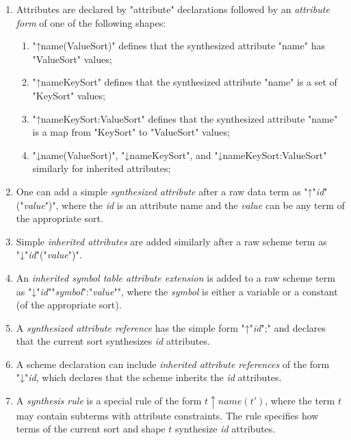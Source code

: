 \documentclass[11pt]{article} %
\begin{document}
\begin{manual}\label{man:attributes}\leavevmode
  \begin{enumerate}

  \item Attributes are declared by "attribute" declarations followed by an \emph{attribute form} of
    one of the following shapes:
    \begin{enumerate}
    \item "↑name(ValueSort)" defines that the synthesized attribute "name" has "ValueSort" values;
    \item "↑name{KeySort}" defines that the synthesized attribute "name" is a set of "KeySort" values;
    \item "↑name{KeySort:ValueSort}" defines that the synthesized attribute "name" is a map from
      "KeySort" to "ValueSort" values;
    \item "↓name(ValueSort)", "↓name{KeySort}", and "↓name{KeySort:ValueSort}" similarly for
      inherited attributes;
    \end{enumerate}

  \item One can add a simple \emph{synthesized attribute} after a raw data term as
    "↑"\emph{id}"("\emph{value}")", where the \emph{id} is an attribute name and the \emph{value}
    can be any term of the appropriate sort.

  \item Simple \emph{inherited attributes} are added similarly after a raw scheme term as
    "↓"\emph{id}"("\emph{value}")".

  \item An \emph{inherited symbol table attribute extension} is added to a raw scheme term as
    "↓"\emph{id}"{"\emph{symbol}":"\emph{value}"}", where the \emph{symbol} is either a variable
    or a constant (of the appropriate sort).

  \item A \emph{synthesized attribute reference} has the simple form "↑"\emph{id}";" and declares
    that the current sort synthesizes \emph{id} attributes.

  \item A scheme declaration can include \emph{inherited attribute references} of the form
    "↓"\emph{id}, which declares that the scheme inherits the \emph{id} attributes.

  \item A \emph{synthesis rule} is a special rule of the form $t↑name(t')$, where the term $t$ may
    contain subterms with attribute constraints. The rule specifies how terms of the current sort
    and shape $t$ synthesize \emph{id} attributes.


\end{enumerate}
\end{manual}
\end{document}
